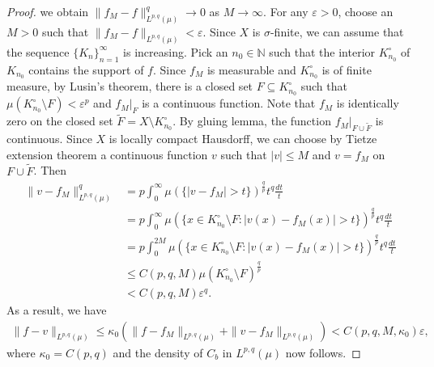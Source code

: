 \documentclass[10pt,a4paper]{amsart}
\begin{document}
\begin{proof}
we obtain $\|f_{M}-f\|_{L^{p,q}(\mu)}^{q}\rightarrow 0$ as $M\rightarrow\infty$. For any $\varepsilon>0$, choose an $M>0$ such that $\|f_{M}-f\|_{L^{p,q}(\mu)}<\varepsilon$. Since $X$ is $\sigma$-finite, we can assume that the sequence $\{K_{n}\}_{n=1}^{\infty}$ is increasing. Pick an $n_{0}\in\mathbb{N}$ such that the interior $K_{n_{0}}^{\circ}$ of $K_{n_{0}}$ contains the support of $f$. Since $f_{M}$ is measurable and $K_{n_{0}}^{\circ}$ is of finite measure, by Lusin's theorem, there is a closed set $F\subseteq K_{n_{0}}^{\circ}$ such that $\mu(K_{n_{0}}^{\circ}\setminus F)<\varepsilon^{p}$ and $f_{M}|_{F}$ is a continuous function. Note that $f_{M}$ is identically zero on the closed set $\widetilde{F}=X\setminus K_{n_{0}}^{\circ}$. By gluing lemma, the function $f_{M}|_{F\cup\widetilde{F}}$ is continuous. Since $X$ is locally compact Hausdorff, we can choose by Tietze extension theorem a continuous function $v$ such that $|v|\leq M$ and $v=f_{M}$ on $F\cup\widetilde{F}$. Then
\begin{align*}
\|v-f_{M}\|_{L^{p,q}(\mu)}^{q}&=p\int_{0}^{\infty}\mu(\{|v-f_{M}|>t\})^{\frac{q}{p}}t^{q}\frac{dt}{t}\\
&=p\int_{0}^{\infty}\mu(\{x\in K_{n_{0}}^{\circ}\setminus F:|v(x)-f_{M}(x)|>t\})^{\frac{q}{p}}t^{q}\frac{dt}{t}\\
&=p\int_{0}^{2M}\mu(\{x\in K_{n_{0}}^{\circ}\setminus F:|v(x)-f_{M}(x)|>t\})^{\frac{q}{p}}t^{q}\frac{dt}{t}\\
&\leq C(p,q,M)\mu(K_{n_{0}}^{\circ}\setminus F)^{\frac{q}{p}}\\
&<C(p,q,M)\varepsilon^{q}.
\end{align*}
As a result, we have 
\begin{align*}
\|f-v\|_{L^{p,q}(\mu)}\leq\kappa_{0}(\|f-f_{M}\|_{L^{p,q}(\mu)}+\|v-f_{M}\|_{L^{p,q}(\mu)})<C(p,q,M,\kappa_{0})\varepsilon,
\end{align*}
where $\kappa_{0}=C(p,q)$ and the density of $C_{b}$ in $L^{p,q}(\mu)$ now follows.


\end{proof}
\end{document}

